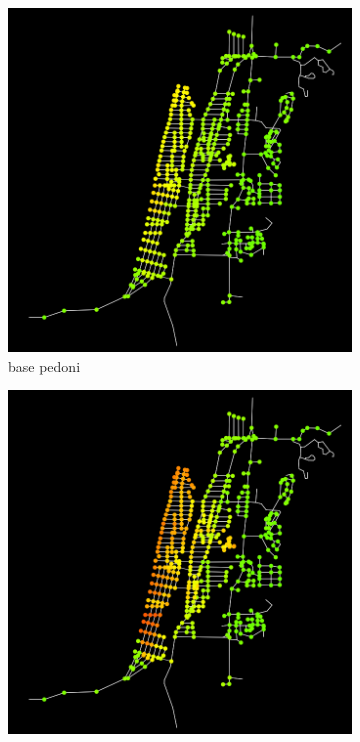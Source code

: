 \begin{figure}
    \centering
    \begin{subfigure}{0.475\textwidth}
        \centering
        \includegraphics[width=\textwidth]{images/analisi/comparison-ev-times-map-base-ped.png}
        \caption{base pedoni}
    \end{subfigure}
    \hfill
    \begin{subfigure}{0.475\textwidth}
        \centering
        \includegraphics[width=\textwidth]{images/analisi/comparison-ev-times-map-new-ped.png}

\end{subfigure}
\end{figure}
